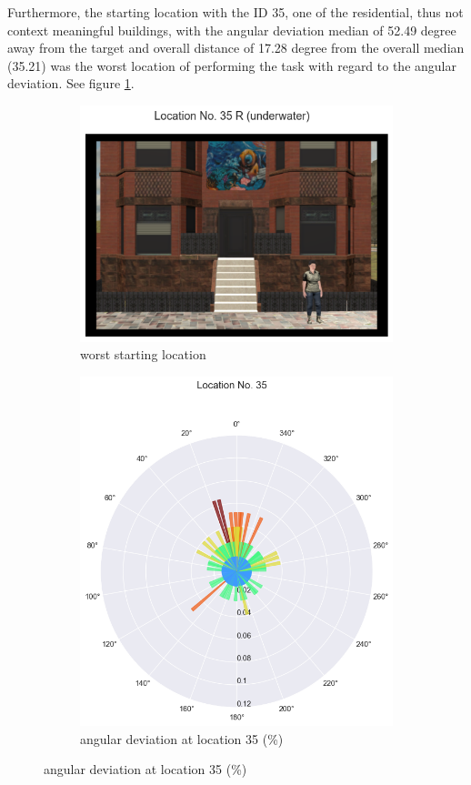 Furthermore, the starting location with the ID 35, one of the residential, thus not context meaningful buildings, with the angular deviation median of 52.49 degree away from the target and overall distance of 17.28 degree from the overall median (35.21) was the worst location of performing the task with regard to the angular deviation. See figure \ref{fig:worst_angular}.

\begin{figure}[!h]
	\begin{subfigure}[b]{0.48\linewidth}
		\includegraphics[width=\linewidth]{figures/worst_loc_angular_error__withHA_23.png}
		\caption{worst starting location}
		\label{fig:worst_angular}
	\end{subfigure}
	\begin{subfigure}[b]{0.48\linewidth}
		\includegraphics[width=\linewidth]{figures/deviation_degrees_loc_nr_35_23.png}
		\caption{angular deviation at location 35 (\%)}
		\label{fig:worst_angular_dist_35}
	\end{subfigure}


\end{figure}
